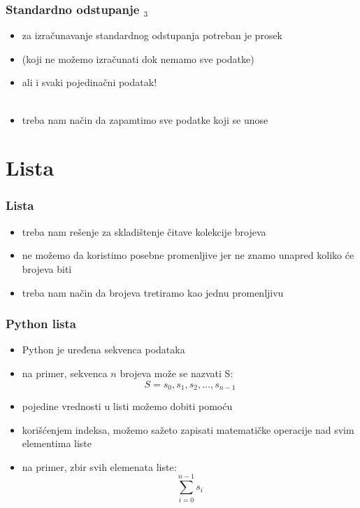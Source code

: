 \documentclass[utf8,compress]{beamer}
\begin{document}
\begin{frame}[fragile]
  \frametitle{Standardno odstupanje $_3$}
  \begin{itemize}
    \item za izračunavanje standardnog odstupanja potreban je prosek
    \item (koji ne možemo izračunati dok nemamo sve podatke)
    \item ali i svaki pojedinačni podatak! \\ \ \\
    \item treba nam način da zapamtimo sve podatke koji se unose
  \end{itemize}
\end{frame}

\section[Lista]{Lista}

\begin{frame}[fragile]
  \frametitle{Lista}
  \begin{itemize}
    \item treba nam rešenje za skladištenje čitave kolekcije brojeva
    \item ne možemo da koristimo posebne promenljive jer ne znamo unapred koliko će brojeva biti
    \item treba nam način da  brojeva tretiramo kao jednu promenljivu
  \end{itemize}
\end{frame}

\begin{frame}[fragile]
  \frametitle{Python lista}
  \begin{itemize}
    \item Python  je uređena sekvenca podataka
    \item na primer, sekvenca $n$ brojeva može se nazvati S: \\
    $$S = s_0, s_1, s_2, \ldots, s_{n-1}$$
    \item pojedine vrednosti u listi možemo dobiti pomoću 
    \item korišćenjem indeksa, možemo sažeto zapisati matematičke operacije nad svim elementima liste
    \item na primer, zbir svih elemenata liste: \\
    $$ \sum_{i=0}^{n-1}{s_i} $$
  \end{itemize}
\end{frame}
\end{document}
